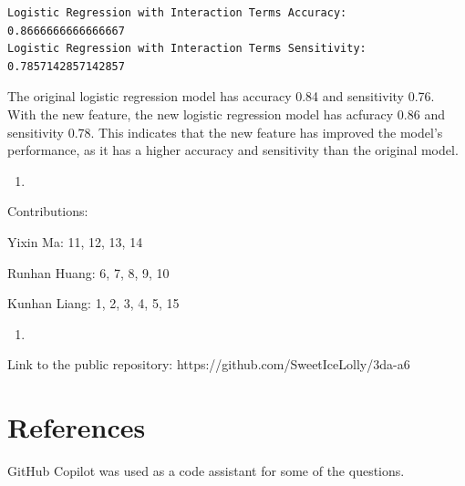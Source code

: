 \documentclass[
  11pt,
  letterpaper,
  DIV=11,
  numbers=noendperiod]{scrartcl}
\providecommand{\tightlist}{%
  \setlength{\itemsep}{0pt}\setlength{\parskip}{0pt}}\usepackage{longtable,booktabs,array}
\begin{document}
\begin{verbatim}
Logistic Regression with Interaction Terms Accuracy:  0.8666666666666667
Logistic Regression with Interaction Terms Sensitivity:  0.7857142857142857
\end{verbatim}

The original logistic regression model has accuracy 0.84 and sensitivity
0.76. With the new feature, the new logistic regression model has
acfuracy 0.86 and sensitivity 0.78. This indicates that the new feature
has improved the model's performance, as it has a higher accuracy and
sensitivity than the original model.

\begin{enumerate}
\def\labelenumi{(\arabic{enumi})}
\setcounter{enumi}{15}
\tightlist
\item
\end{enumerate}

Contributions:

Yixin Ma: 11, 12, 13, 14

Runhan Huang: 6, 7, 8, 9, 10

Kunhan Liang: 1, 2, 3, 4, 5, 15

\begin{enumerate}
\def\labelenumi{(\arabic{enumi})}
\setcounter{enumi}{16}
\tightlist
\item
\end{enumerate}

Link to the public repository: https://github.com/SweetIceLolly/3da-a6

\newpage

\section{References}\label{references}

GitHub Copilot was used as a code assistant for some of the questions.
\end{document}
